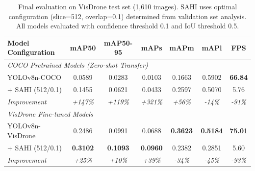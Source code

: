 \begin{table}[ht]
    \centering
    \caption{Final evaluation on VisDrone test set (1,610 images). SAHI uses optimal configuration (slice=512, overlap=0.1) determined from validation set analysis. All models evaluated with confidence threshold 0.1 and IoU threshold 0.5.}
    \label{tab:final_evaluation}
    \setlength{\tabcolsep}{3.5pt}
    \renewcommand{\arraystretch}{1.1}
    \begin{tabular}{|l|c|c|c|c|c|c|}
        \hline
        \textbf{Model Configuration} & \textbf{mAP50} & \textbf{mAP50-95} & \textbf{mAPs} & \textbf{mAPm} & \textbf{mAPl} & \textbf{FPS} \\
        \hline
        \hline
        \multicolumn{7}{|l|}{\textit{COCO Pretrained Models (Zero-shot Transfer)}} \\
        \hline
        YOLOv8n-COCO & 0.0589 & 0.0283 & 0.0103 & 0.1663 & 0.5902 & \textbf{66.84} \\
        \quad + SAHI (512/0.1) & 0.1455 & 0.0621 & 0.0433 & 0.2597 & 0.5070 & 5.76 \\
        \quad \textit{Improvement} & \textit{+147\%} & \textit{+119\%} & \textit{+321\%} & \textit{+56\%} & \textit{-14\%} & \textit{-91\%} \\
        \hline
        \multicolumn{7}{|l|}{\textit{VisDrone Fine-tuned Models}} \\
        \hline
        YOLOv8n-VisDrone & 0.2486 & 0.0991 & 0.0688 & \textbf{0.3623} & \textbf{0.5184} & \textbf{75.01} \\
        \quad + SAHI (512/0.1) & \textbf{0.3102} & \textbf{0.1093} & \textbf{0.0960} & 0.2382 & 0.2851 & 5.60 \\
        \quad \textit{Improvement} & \textit{+25\%} & \textit{+10\%} & \textit{+39\%} & \textit{-34\%} & \textit{-45\%} & \textit{-93\%} \\
        \hline
    \end{tabular}
\end{table}

